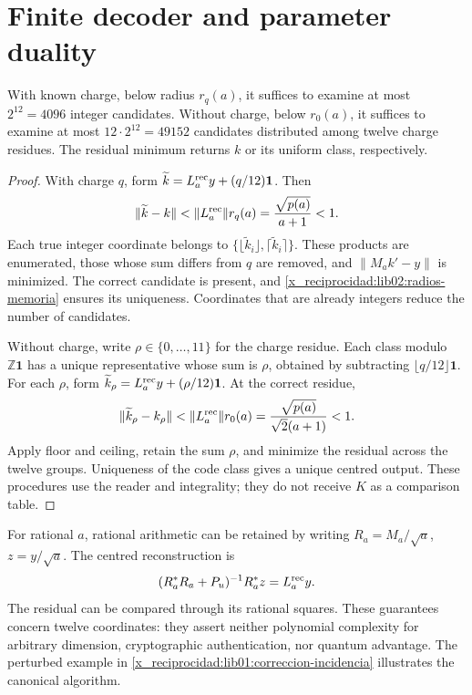 \section{Finite decoder and parameter duality}
\label{x_reciprocidad:lib02:computacion}

\begin{proposition}
\label{x_reciprocidad:lib02:decodificador}
With known charge, below radius \(r_q(a)\), it suffices to examine at most \(2^{12}=4096\) integer candidates. Without charge, below \(r_0(a)\), it suffices to examine at most \(12\cdot2^{12}=49152\) candidates distributed among twelve charge residues. The residual minimum returns \(k\) or its uniform class, respectively.
\end{proposition}
\begin{proof}
With charge \(q\), form \(\widetilde k=L_a^{\rm rec}y+(q/12)\mathbf1\). Then
\[
 \|\widetilde k-k\|
 <\|L_a^{\rm rec}\|r_q(a)
 =\frac{\sqrt{p(a)}}{a+1}<1.
\]
Each true integer coordinate belongs to \(\{\lfloor\widetilde k_i\rfloor,
\lceil\widetilde k_i\rceil\}\). These products are enumerated, those whose sum differs from \(q\) are removed, and \(\|M_ak'-y\|\) is minimized. The correct candidate is present, and \cref{x_reciprocidad:lib02:radios-memoria} ensures its uniqueness. Coordinates that are already integers reduce the number of candidates.

Without charge, write \(\rho\in\{0,\ldots,11\}\) for the charge residue. Each class modulo \(\mathbb Z\mathbf1\) has a unique representative whose sum is \(\rho\), obtained by subtracting \(\lfloor q/12\rfloor\mathbf1\). For each \(\rho\), form \(\widetilde k_\rho=L_a^{\rm rec}y+(\rho/12)\mathbf1\). At the correct residue,
\[
 \|\widetilde k_\rho-k_\rho\|
 <\|L_a^{\rm rec}\|r_0(a)
 =\frac{\sqrt{p(a)}}{\sqrt2(a+1)}<1.
\]
Apply floor and ceiling, retain the sum \(\rho\), and minimize the residual across the twelve groups. Uniqueness of the code class gives a unique centred output. These procedures use the reader and integrality; they do not receive \(K\) as a comparison table.
\end{proof}

For rational \(a\), rational arithmetic can be retained by writing \(R_a=M_a/\sqrt a\), \(z=y/\sqrt a\). The centred reconstruction is
\[
 (R_a^*R_a+P_u)^{-1}R_a^*z=L_a^{\rm rec}y.
\]
The residual can be compared through its rational squares. These guarantees concern twelve coordinates: they assert neither polynomial complexity for arbitrary dimension, cryptographic authentication, nor quantum advantage. The perturbed example in \cref{x_reciprocidad:lib01:correccion-incidencia} illustrates the canonical algorithm.

